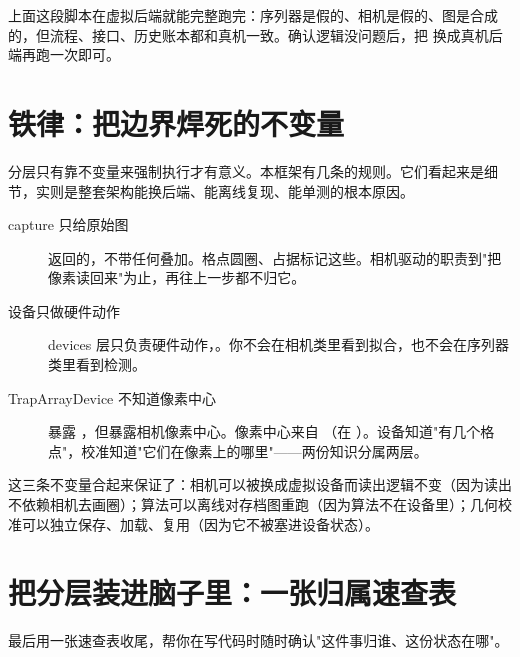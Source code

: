 \documentclass[11pt,oneside,openany]{book}
\begin{document}
\begin{notebox}[先在虚拟后端跑这一段]
上面这段脚本在虚拟后端就能完整跑完：序列器是假的、相机是假的、图是合成的，但流程、接口、历史账本都和真机一致。确认逻辑没问题后，把  换成真机后端再跑一次即可。
\end{notebox}

\section{铁律：把边界焊死的不变量}

分层只有靠不变量来强制执行才有意义。本框架有几条的规则。它们看起来是细节，实则是整套架构能换后端、能离线复现、能单测的根本原因。

\begin{description}
\item[capture 只给原始图]  返回的，不带任何叠加。格点圆圈、占据标记这些。相机驱动的职责到"把像素读回来"为止，再往上一步都不归它。
\item[设备只做硬件动作] devices 层只负责硬件动作，。你不会在相机类里看到拟合，也不会在序列器类里看到检测。
\item[TrapArrayDevice 不知道像素中心]  暴露 ，但暴露相机像素中心。像素中心来自 （在 ）。设备知道"有几个格点"，校准知道"它们在像素上的哪里"——两份知识分属两层。
\end{description}

\begin{notebox}[为什么这几条这么重要]
这三条不变量合起来保证了：相机可以被换成虚拟设备而读出逻辑不变（因为读出不依赖相机去画圈）；算法可以离线对存档图重跑（因为算法不在设备里）；几何校准可以独立保存、加载、复用（因为它不被塞进设备状态）。
\end{notebox}

\section{把分层装进脑子里：一张归属速查表}

最后用一张速查表收尾，帮你在写代码时随时确认"这件事归谁、这份状态在哪"。
\end{document}
